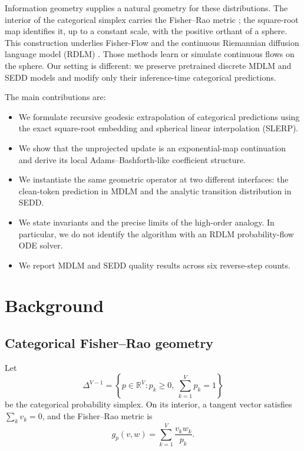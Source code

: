 \documentclass[10pt]{article}
\newcommand{\simplex}{\Delta^{V-1}}
\begin{document}
Information geometry supplies a natural geometry for these distributions.  The interior of the
categorical simplex carries the Fisher--Rao metric \citep{amari2016information}; the square-root map
identifies it, up to a constant scale, with the positive orthant of a sphere.  This construction underlies
Fisher-Flow \citep{davis2024fisherflow} and the continuous Riemannian diffusion language model (RDLM)
\citep{jo2025rdlm}.  Those methods learn or simulate continuous flows on the sphere.  Our setting is
different: we preserve pretrained discrete MDLM and SEDD models and modify only their inference-time
categorical predictions.

The main contributions are:
\begin{itemize}
  \item We formulate recursive geodesic extrapolation of categorical predictions using the exact
  square-root embedding and spherical linear interpolation (SLERP).
  \item We show that the unprojected update is an exponential-map continuation and derive its local
  Adams--Bashforth-like coefficient structure.
  \item We instantiate the same geometric operator at two different interfaces: the clean-token
  prediction in MDLM and the analytic transition distribution in SEDD.
  \item We state invariants and the precise limits of the high-order analogy.
  In particular, we do not identify the algorithm with an RDLM probability-flow ODE solver.
  \item We report MDLM and SEDD quality results across six reverse-step counts.
\end{itemize}

\section{Background}

\subsection{Categorical Fisher--Rao geometry}

Let
\begin{equation}
  \simplex
  = \left\{p\in\mathbb{R}^{V}: p_k\ge 0,\ \sum_{k=1}^{V}p_k=1\right\}
\end{equation}
be the categorical probability simplex.  On its interior, a tangent vector satisfies
$\sum_k v_k=0$, and the Fisher--Rao metric is
\begin{equation}
  g_p(v,w)=\sum_{k=1}^{V}\frac{v_kw_k}{p_k}.
  \label{eq:fisher_metric}
\end{equation}
\end{document}
